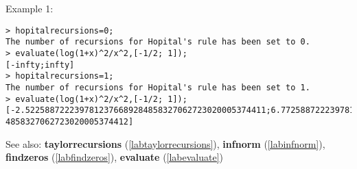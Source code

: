 \noindent Example 1: 
\begin{center}\begin{minipage}{15cm}\begin{Verbatim}[frame=single,commandchars=\\\|\~]
> hopitalrecursions=0;
The number of recursions for Hopital's rule has been set to 0.
> evaluate(log(1+x)^2/x^2,[-1/2; 1]);
[-infty;infty]
> hopitalrecursions=1;
The number of recursions for Hopital's rule has been set to 1.
> evaluate(log(1+x)^2/x^2,[-1/2; 1]);
[-2.5225887222397812376689284858327062723020005374411;6.772588722239781237668928
4858327062723020005374412]
\end{Verbatim}
\end{minipage}\end{center}
See also: \textbf{taylorrecursions} (\ref{labtaylorrecursions}), \textbf{infnorm} (\ref{labinfnorm}), \textbf{findzeros} (\ref{labfindzeros}), \textbf{evaluate} (\ref{labevaluate})
